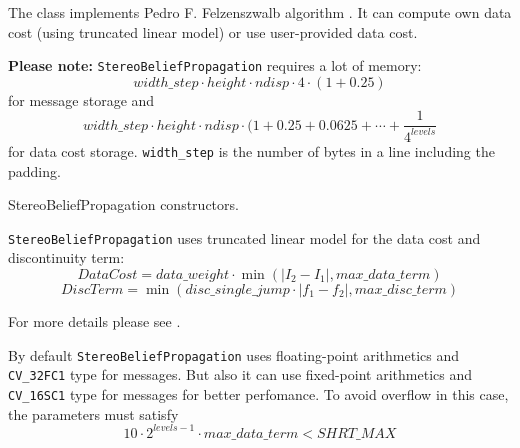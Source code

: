 The class implements Pedro F. Felzenszwalb algorithm \cite{felzenszwalb_bp}. It can compute own data cost (using truncated linear model) or use user-provided data cost.

\textbf{Please note:} \texttt{StereoBeliefPropagation} requires a lot of memory:
\[
width\_step \cdot height \cdot ndisp \cdot 4 \cdot (1 + 0.25)
\]
for message storage and
\[
width\_step \cdot height \cdot ndisp \cdot (1 + 0.25 + 0.0625 + \dotsm + \frac{1}{4^{levels}}
\]
for data cost storage. \texttt{width\_step} is the number of bytes in a line including the padding.


StereoBeliefPropagation constructors.


\begin{description}
\end{description}

\texttt{StereoBeliefPropagation} uses truncated linear model for the data cost and discontinuity term:
\[ 
DataCost = data\_weight \cdot \min(\lvert I_2-I_1 \rvert, max\_data\_term)
\]
\[
DiscTerm = \min(disc\_single\_jump \cdot \lvert f_1-f_2 \rvert, max\_disc\_term)
\]

For more details please see \cite{felzenszwalb_bp}.

By default \texttt{StereoBeliefPropagation} uses floating-point arithmetics and \texttt{CV\_32FC1} type for messages. But also it can use fixed-point arithmetics and \texttt{CV\_16SC1} type for messages for better perfomance. To avoid overflow in this case, the parameters must satisfy 
\[
10 \cdot 2^{levels-1} \cdot max\_data\_term < SHRT\_MAX
\]



